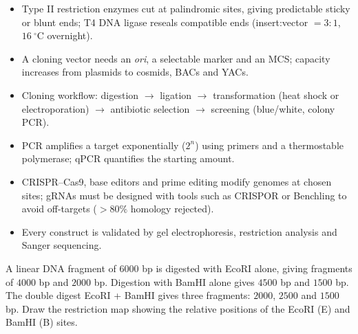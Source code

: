 \documentclass[11pt]{article}
\begin{document}
\begin{aretenir}
\begin{itemize}
\item Type II restriction enzymes cut at palindromic sites, giving predictable sticky or blunt ends; T4 DNA ligase reseals compatible ends (insert:vector $= 3:1$, $16\ ^\circ$C overnight).
\item A cloning vector needs an \emph{ori}, a selectable marker and an MCS; capacity increases from plasmids to cosmids, BACs and YACs.
\item Cloning workflow: digestion $\to$ ligation $\to$ transformation (heat shock or electroporation) $\to$ antibiotic selection $\to$ screening (blue/white, colony PCR).
\item PCR amplifies a target exponentially ($2^n$) using primers and a thermostable polymerase; qPCR quantifies the starting amount.
\item CRISPR--Cas9, base editors and prime editing modify genomes at chosen sites; gRNAs must be designed with tools such as CRISPOR or Benchling to avoid off-targets ($>80\%$ homology rejected).
\item Every construct is validated by gel electrophoresis, restriction analysis and Sanger sequencing.
\end{itemize}
\end{aretenir}

\begin{exercice}
A linear DNA fragment of $6000$ bp is digested with EcoRI alone, giving fragments of $4000$ bp and $2000$ bp. Digestion with BamHI alone gives $4500$ bp and $1500$ bp. The double digest EcoRI + BamHI gives three fragments: $2000$, $2500$ and $1500$ bp. Draw the restriction map showing the relative positions of the EcoRI (E) and BamHI (B) sites.
\end{exercice}
\end{document}
